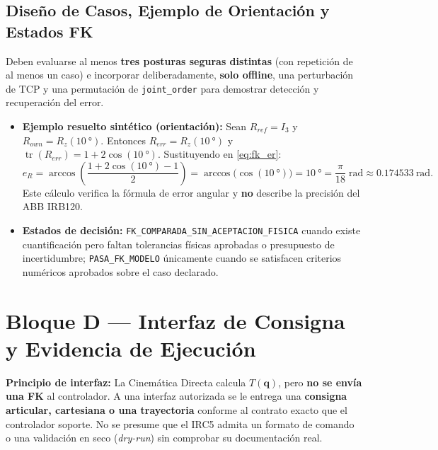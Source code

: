 \documentclass[10pt, a4paper]{article}
\begin{document}
\subsection{Diseño de Casos, Ejemplo de Orientación y Estados FK}
Deben evaluarse al menos \textbf{tres posturas seguras distintas} (con repetición de al menos un caso) e incorporar deliberadamente, \textbf{solo offline}, una perturbación de TCP y una permutación de \texttt{joint\_order} para demostrar detección y recuperación del error.
\begin{itemize}[leftmargin=*, itemsep=2pt]
    \item \textbf{Ejemplo resuelto sintético (orientación):} Sean $R_{ref} = I_3$ y $R_{own} = R_z(\SI{10}{\degree})$. Entonces $R_{err} = R_z(\SI{10}{\degree})$ y $\operatorname{tr}(R_{err}) = 1 + 2\cos(\SI{10}{\degree})$. Sustituyendo en \eqref{eq:fk_er}:
    \begin{equation}
        e_R = \arccos\!\left(\frac{1 + 2\cos(\SI{10}{\degree}) - 1}{2}\right) = \arccos\big(\cos(\SI{10}{\degree})\big) = \SI{10}{\degree} = \frac{\pi}{18}\;\mathrm{rad} \approx \SI{0.174533}{\radian}.
        \label{eq:ex_er}
    \end{equation}
    Este cálculo verifica la fórmula de error angular y \textbf{no} describe la precisión del ABB IRB120.
    \item \textbf{Estados de decisión:} \texttt{FK\_COMPARADA\_SIN\_ACEPTACION\_FISICA} cuando existe cuantificación pero faltan tolerancias físicas aprobadas o presupuesto de incertidumbre; \texttt{PASA\_FK\_MODELO} únicamente cuando se satisfacen criterios numéricos aprobados sobre el caso declarado.
\end{itemize}

\section{Bloque D — Interfaz de Consigna y Evidencia de Ejecución}

\textbf{Principio de interfaz:} La Cinemática Directa calcula $T(\mathbf{q})$, pero \textbf{no se envía una FK} al controlador. A una interfaz autorizada se le entrega una \textbf{consigna articular, cartesiana o una trayectoria} conforme al contrato exacto que el controlador soporte. No se presume que el IRC5 admita un formato de comando o una validación en seco (\textit{dry-run}) sin comprobar su documentación real.
\end{document}
